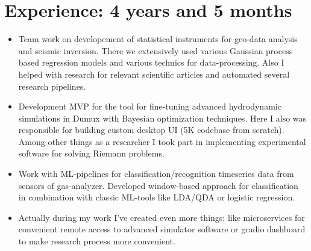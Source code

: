 \documentclass[12pt,a4paper]{moderncv}
\begin{document}
\section{Experience: 4 years and 5 months}
\begin{itemize}
\item Team work on developement of statistical instruments for geo-data analysis and seismic inversion. 
There we extensively used various Gaussian process based regression models and various technics for data-processing. 
Also I helped with research for relevant scientific articles and automated several research pipelines. \newline

\item Development MVP for the tool for fine-tuning advanced hydrodynamic simulations in Dumux with Bayesian optimization techniques. 
Here I also was responsible for building custom desktop UI (5K codebase from scratch). 
Among other things as a researcher I took part in implementing experimental software for solving Riemann problems. 
\newline

\item Work with ML-pipelines for classification/recognition timeseries data from sensors of gas-analyzer.
Developed window-based approach for classification in combination with classic ML-tools like LDA/QDA or logistic regression. \newline

\item Actually during my work I've created even more things: like microservices for convenient remote access to advanced simulator software
or gradio dashboard to make research process more convenient. \newline \newline

\end{itemize}
\end{document}

